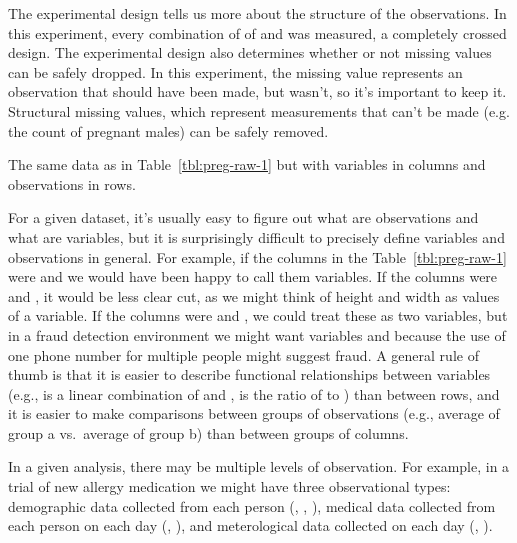 \documentclass[article]{jss}
\begin{document}
The experimental design tells us more about the structure of the observations. In this experiment, every combination of of  and  was measured, a completely crossed design. The experimental design also determines whether or not missing values can be safely dropped. In this experiment, the missing value represents an observation that should have been made, but wasn't, so it's important to keep it. Structural missing values, which represent measurements that can't be made (e.g. the count of pregnant males) can be safely removed.

\begin{table}[htbp]
  \centering
  
  \caption{The same data as in Table~\ref{tbl:preg-raw-1} but with variables in columns and observations in rows.}
  \label{tbl:preg-tidy}
\end{table}

For a given dataset, it's usually easy to figure out what are observations and what are variables, but it is surprisingly difficult to precisely define variables and observations in general. For example, if the columns in the Table~\ref{tbl:preg-raw-1} were  and  we would have been happy to call them variables. If the columns were  and , it would be less clear cut, as we might think of height and width as values of a  variable. If the columns were  and , we could treat these as two variables, but in a fraud detection environment we might want variables  and  because the use of one phone number for multiple people might suggest fraud. A general rule of thumb is that it is easier to describe functional relationships between variables (e.g.,  is a linear combination of  and ,  is the ratio of  to ) than between rows, and it is easier to make comparisons between groups of observations (e.g., average of group a vs.\ average of group b) than between groups of columns.

In a given analysis, there may be multiple levels of observation. For example, in a trial of new allergy medication we might have three observational types: demographic data collected from each person (, , ), medical data collected from each person on each day (, ), and meterological data collected on each day (, ).
\end{document}
